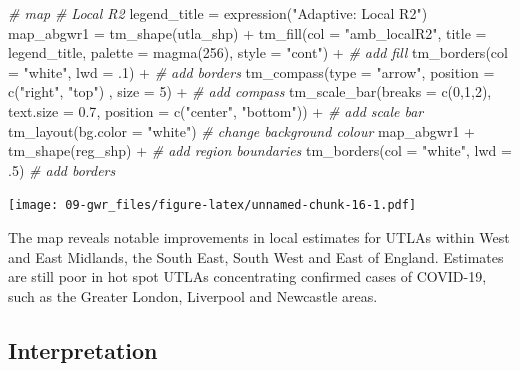 \documentclass[
]{book}
\newenvironment{Shaded}{\begin{snugshade}}{\end{snugshade}}
\newcommand{\AttributeTok}[1]{\textcolor[rgb]{0.77,0.63,0.00}{#1}}
\newcommand{\CommentTok}[1]{\textcolor[rgb]{0.56,0.35,0.01}{\textit{#1}}}
\newcommand{\DecValTok}[1]{\textcolor[rgb]{0.00,0.00,0.81}{#1}}
\newcommand{\FloatTok}[1]{\textcolor[rgb]{0.00,0.00,0.81}{#1}}
\newcommand{\FunctionTok}[1]{\textcolor[rgb]{0.00,0.00,0.00}{#1}}
\newcommand{\NormalTok}[1]{#1}
\newcommand{\OtherTok}[1]{\textcolor[rgb]{0.56,0.35,0.01}{#1}}
\newcommand{\SpecialCharTok}[1]{\textcolor[rgb]{0.00,0.00,0.00}{#1}}
\newcommand{\StringTok}[1]{\textcolor[rgb]{0.31,0.60,0.02}{#1}}
\begin{document}
\begin{Shaded}
\begin{Highlighting}[]
\CommentTok{\# map}
  \CommentTok{\# Local R2}
\NormalTok{legend\_title }\OtherTok{=} \FunctionTok{expression}\NormalTok{(}\StringTok{"Adaptive: Local R2"}\NormalTok{)}
\NormalTok{map\_abgwr1 }\OtherTok{=} \FunctionTok{tm\_shape}\NormalTok{(utla\_shp) }\SpecialCharTok{+}
  \FunctionTok{tm\_fill}\NormalTok{(}\AttributeTok{col =} \StringTok{"amb\_localR2"}\NormalTok{, }\AttributeTok{title =}\NormalTok{ legend\_title, }\AttributeTok{palette =} \FunctionTok{magma}\NormalTok{(}\DecValTok{256}\NormalTok{), }\AttributeTok{style =} \StringTok{"cont"}\NormalTok{) }\SpecialCharTok{+} \CommentTok{\# add fill}
  \FunctionTok{tm\_borders}\NormalTok{(}\AttributeTok{col =} \StringTok{"white"}\NormalTok{, }\AttributeTok{lwd =}\NormalTok{ .}\DecValTok{1}\NormalTok{)  }\SpecialCharTok{+} \CommentTok{\# add borders}
  \FunctionTok{tm\_compass}\NormalTok{(}\AttributeTok{type =} \StringTok{"arrow"}\NormalTok{, }\AttributeTok{position =} \FunctionTok{c}\NormalTok{(}\StringTok{"right"}\NormalTok{, }\StringTok{"top"}\NormalTok{) , }\AttributeTok{size =} \DecValTok{5}\NormalTok{) }\SpecialCharTok{+} \CommentTok{\# add compass}
  \FunctionTok{tm\_scale\_bar}\NormalTok{(}\AttributeTok{breaks =} \FunctionTok{c}\NormalTok{(}\DecValTok{0}\NormalTok{,}\DecValTok{1}\NormalTok{,}\DecValTok{2}\NormalTok{), }\AttributeTok{text.size =} \FloatTok{0.7}\NormalTok{, }\AttributeTok{position =}  \FunctionTok{c}\NormalTok{(}\StringTok{"center"}\NormalTok{, }\StringTok{"bottom"}\NormalTok{)) }\SpecialCharTok{+} \CommentTok{\# add scale bar}
  \FunctionTok{tm\_layout}\NormalTok{(}\AttributeTok{bg.color =} \StringTok{"white"}\NormalTok{) }\CommentTok{\# change background colour}
\NormalTok{map\_abgwr1 }\SpecialCharTok{+} \FunctionTok{tm\_shape}\NormalTok{(reg\_shp) }\SpecialCharTok{+} \CommentTok{\# add region boundaries}
  \FunctionTok{tm\_borders}\NormalTok{(}\AttributeTok{col =} \StringTok{"white"}\NormalTok{, }\AttributeTok{lwd =}\NormalTok{ .}\DecValTok{5}\NormalTok{) }\CommentTok{\# add borders}
\end{Highlighting}
\end{Shaded}

\texttt{[image: 09-gwr\_files/figure-latex/unnamed-chunk-16-1.pdf]}

The map reveals notable improvements in local estimates for UTLAs within West and East Midlands, the South East, South West and East of England. Estimates are still poor in hot spot UTLAs concentrating confirmed cases of COVID-19, such as the Greater London, Liverpool and Newcastle areas.

\hypertarget{interpretation-1}{%
\subsection{Interpretation}\label{interpretation-1}}
\end{document}
